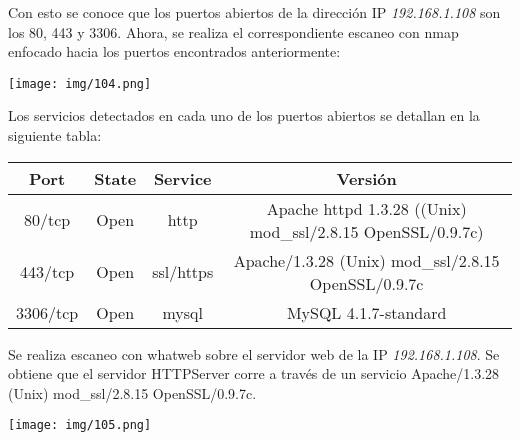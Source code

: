 \documentclass[12pt,oneside,a4paper]{book}
\begin{document}
\vspace{1em}

\hspace{20pt}
Con esto se conoce que los puertos abiertos de la dirección IP \textit{192.168.1.108} son los 80, 443 y 3306. Ahora, se realiza el correspondiente escaneo con nmap enfocado hacia los puertos encontrados anteriormente:

\vspace{1em}

\begin{center}
    \texttt{[image: img/104.png]}
\end{center}

\vspace{1em}

\hspace{20pt}
Los servicios detectados en cada uno de los puertos abiertos se detallan en la siguiente tabla:

\vspace{1em}

\begin{table}[H]
    \centering
    \begin{tabular}{|c|c|c|c|}
         \hline
         \textbf{ Port } & \textbf{ State } & \textbf{ Service } & \textbf{ Versión } \\
         \hline
         80/tcp & Open  & http & Apache httpd 1.3.28 ((Unix) mod\_ssl/2.8.15 OpenSSL/0.9.7c) \\
         \hline
         443/tcp & Open  & ssl/https & Apache/1.3.28 (Unix) mod\_ssl/2.8.15 OpenSSL/0.9.7c \\
         \hline
         3306/tcp & Open  & mysql & MySQL 4.1.7-standard \\         
         \hline
    \end{tabular}
\end{table}

\vspace{1em}

\hspace{20pt}
Se realiza escaneo con whatweb sobre el servidor web de la IP \textit{192.168.1.108}. Se obtiene que el servidor HTTPServer corre a través de un servicio Apache/1.3.28 (Unix) mod\_ssl/2.8.15 OpenSSL/0.9.7c.

\vspace{1em}

\begin{center}
    \texttt{[image: img/105.png]}
\end{center}
\end{document}
